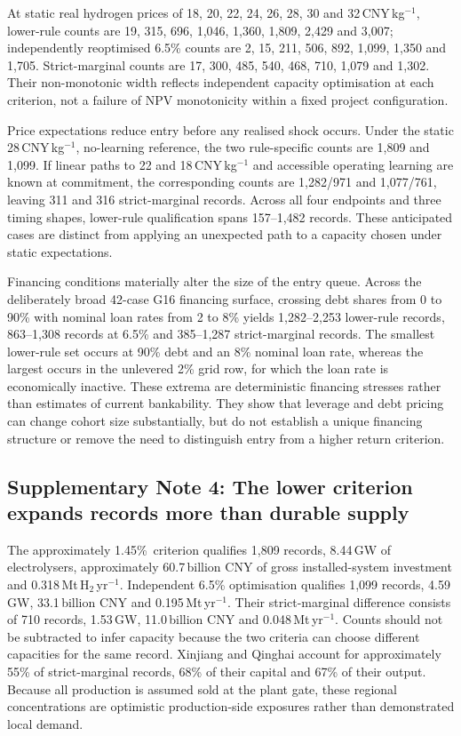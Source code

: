\documentclass[pdflatex,sn-nature]{sn-jnl}
\newcommand{\lowhurdle}{approximately 1.45\%}
\begin{document}
At static real hydrogen prices of 18, 20, 22, 24, 26, 28, 30 and 32\,CNY\,kg$^{-1}$, lower-rule counts are 19, 315, 696, 1,046, 1,360, 1,809, 2,429 and 3,007; independently reoptimised 6.5\% counts are 2, 15, 211, 506, 892, 1,099, 1,350 and 1,705. Strict-marginal counts are 17, 300, 485, 540, 468, 710, 1,079 and 1,302. Their non-monotonic width reflects independent capacity optimisation at each criterion, not a failure of NPV monotonicity within a fixed project configuration.

Price expectations reduce entry before any realised shock occurs. Under the static 28\,CNY\,kg$^{-1}$, no-learning reference, the two rule-specific counts are 1,809 and 1,099. If linear paths to 22 and 18\,CNY\,kg$^{-1}$ and accessible operating learning are known at commitment, the corresponding counts are 1,282/971 and 1,077/761, leaving 311 and 316 strict-marginal records. Across all four endpoints and three timing shapes, lower-rule qualification spans 157--1,482 records. These anticipated cases are distinct from applying an unexpected path to a capacity chosen under static expectations.

Financing conditions materially alter the size of the entry queue. Across the deliberately broad 42-case G16 financing surface, crossing debt shares from 0 to 90\% with nominal loan rates from 2 to 8\% yields 1,282--2,253 lower-rule records, 863--1,308 records at 6.5\% and 385--1,287 strict-marginal records. The smallest lower-rule set occurs at 90\% debt and an 8\% nominal loan rate, whereas the largest occurs in the unlevered 2\% grid row, for which the loan rate is economically inactive. These extrema are deterministic financing stresses rather than estimates of current bankability. They show that leverage and debt pricing can change cohort size substantially, but do not establish a unique financing structure or remove the need to distinguish entry from a higher return criterion.

\subsection*{Supplementary Note 4: The lower criterion expands records more than durable supply}

The \lowhurdle\ criterion qualifies 1,809 records, 8.44\,GW of electrolysers, approximately 60.7\,billion CNY of gross installed-system investment and 0.318\,Mt\,H$_2$\,yr$^{-1}$. Independent 6.5\% optimisation qualifies 1,099 records, 4.59\,GW, 33.1\,billion CNY and 0.195\,Mt\,yr$^{-1}$. Their strict-marginal difference consists of 710 records, 1.53\,GW, 11.0\,billion CNY and 0.048\,Mt\,yr$^{-1}$. Counts should not be subtracted to infer capacity because the two criteria can choose different capacities for the same record. Xinjiang and Qinghai account for approximately 55\% of strict-marginal records, 68\% of their capital and 67\% of their output. Because all production is assumed sold at the plant gate, these regional concentrations are optimistic production-side exposures rather than demonstrated local demand.
\end{document}
